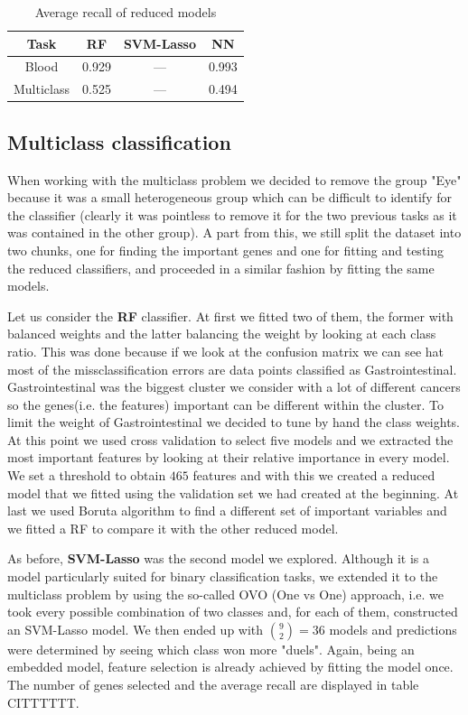 \documentclass[a4paper,11pt, oneside]{article}  %
\begin{document}
	\begin{table}[h!]
		\caption{Average recall of reduced models}
		\centering
		\begin{tabular}{c c c c}
			\hline\hline
			Task & RF & SVM-Lasso & NN \\ [0.5ex] %
			\hline
			Blood & 0.929 & --- & 0.993 \\
			Multiclass & 0.525 &  --- & 0.494 \\ [1ex]
			\hline
		\end{tabular}
		\label{table:reduced_models}
	\end{table}
	
	
	
	
	
	\subsection{Multiclass classification}
	When working with the multiclass problem we decided to remove the group "Eye" because it was a small heterogeneous group which can be difficult to identify for the classifier (clearly it was pointless to remove it for the two previous tasks as it was contained in the other group).  A part from this,  we still split the dataset into two chunks,  one for finding the important genes and one for fitting and testing the reduced classifiers,  and proceeded in a similar fashion by fitting the same models.
	
	Let us consider the \textbf{RF}  classifier. At first we fitted two of them, the former with balanced weights and the latter balancing the weight by looking at each class ratio. This was done because if we look at the confusion matrix we can see hat most of the missclassification errors are data points classified as Gastrointestinal. Gastrointestinal was the biggest cluster we consider with a lot of different cancers so the genes(i.e. the features) important can be different within the cluster. To limit the weight of Gastrointestinal we decided to tune by hand the class weights. At this point we used cross validation to select five models and we extracted the most important features by looking at their relative importance in every model. We set a threshold to obtain  $465$ features and with this we created a reduced model that we fitted using the validation set we had created at the beginning. At last we used Boruta algorithm to find a different set of important variables and we fitted a RF to compare it with the other reduced model.
	
As before,  \textbf{SVM-Lasso} was the second model we explored.  Although it is a model particularly suited for binary classification tasks, we extended it to the multiclass problem by using the so-called OVO (One vs One) approach,  i.e. we took every possible combination of two classes and,  for each of them,  constructed an SVM-Lasso model.  We then ended up with $ \binom{9}{2} = 36$ models and predictions were determined by seeing which class won more "duels".  Again,  being an embedded model,  feature selection is already achieved by fitting the model once.  The number of genes selected and the average recall are displayed in table CITTTTTT.
	
\end{document}
